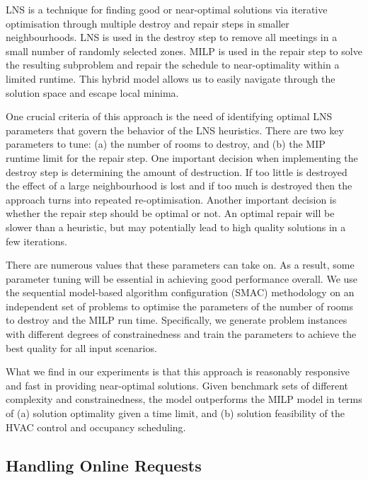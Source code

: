 LNS is a technique for finding good or near-optimal solutions via iterative optimisation through multiple destroy and repair steps in smaller neighbourhoods. LNS is used in the destroy step to remove all meetings in a small number of randomly selected zones. MILP is used in the repair step to solve the resulting subproblem and repair the schedule to near-optimality within a limited runtime. %
This hybrid model allows us to easily navigate through the solution space and escape local minima.

One crucial criteria of this approach is the need of identifying optimal LNS parameters that govern the behavior of the LNS heuristics. There are two key parameters to tune: (a) the number of rooms to destroy, and (b) the MIP runtime limit for the repair step. One important decision when implementing the destroy step is determining the amount of destruction. If too little is destroyed the effect of a large neighbourhood is lost and if too much is destroyed then the approach turns into repeated re-optimisation. Another important decision is whether the repair step should be optimal or not. An optimal repair will be slower than a heuristic, but may potentially lead to high quality solutions in a few iterations. 

There are numerous values that these parameters can take on. As a result, some parameter tuning will be essential in achieving good performance overall. We use the sequential model-based algorithm configuration (SMAC) methodology \citep{hutter2011sequential} on an independent set of problems to optimise the parameters of the number of rooms to destroy and the MILP run time. Specifically, we generate problem instances with different degrees of constrainedness and train the parameters to achieve the best quality for all input scenarios.

What we find in our experiments is that this approach is reasonably responsive and fast in providing near-optimal solutions. Given benchmark sets of different complexity and constrainedness, the model outperforms the MILP model in terms of (a) solution optimality given a time limit, and (b) solution feasibility of the HVAC control and occupancy scheduling.


\subsection{Handling Online Requests}

